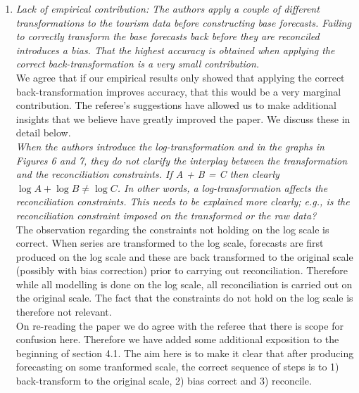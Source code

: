\documentclass[a4paper,11pt]{article}
\begin{document}
	
	\begin{enumerate}
		
		
		
		\item \textit{Lack of empirical contribution: The authors apply a couple of different transformations to the tourism data before constructing base forecasts. Failing to correctly transform the base forecasts back before they are reconciled introduces a bias. That the highest accuracy is obtained when applying the correct back-transformation is a very small contribution.}\\
		
		We agree that if our empirical results only showed that applying the correct back-transformation improves accuracy, that this would be a very marginal contribution.  The referee's suggestions have allowed us to make additional insights that we believe have greatly improved the paper.  We discuss these in detail below.\\
		
        \textit{When the authors introduce the log-transformation and in the graphs in Figures 6 and 7, they do not clarify the interplay between the transformation and the reconciliation constraints. If A + B = C then clearly $\log A + \log B \neq \log C$. In other words, a log-transformation affects the	reconciliation constraints. This needs to be explained more clearly; e.g., is the reconciliation constraint imposed on the transformed or the raw data?}\\
		
		The observation regarding the constraints not holding on the log scale is correct.  When series are transformed to the log scale, forecasts are first produced on the log scale and these are back transformed to the original scale (possibly with bias correction) prior to carrying out reconciliation.  Therefore while all modelling is done on the log scale, all reconciliation is carried out on the original scale.  The fact that the constraints do not hold on the log scale is therefore not relevant.\\
		
		On re-reading the paper we do agree with the referee that there is scope for confusion here.  Therefore we have added some additional exposition to the beginning of section 4.1.  The aim here is to make it clear that after producing forecasting on some tranformed scale, the correct sequence of steps is to 1) back-transform to the original scale, 2) bias correct and 3) reconcile. \\
		

\end{enumerate}
\end{document}
